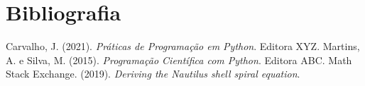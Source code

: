 \documentclass[12pt,a4paper,oneside]{extarticle}
\begin{document}
\section{Bibliografia}
\begin{thebibliography}{9}
 Carvalho, J. (2021). \emph{Práticas de Programação em Python}. Editora XYZ.
 Martins, A. e Silva, M. (2015). \emph{Programação Científica com Python}. Editora ABC.
 Math Stack Exchange. (2019). \emph{Deriving the Nautilus shell spiral equation}.
\end{thebibliography}
\end{document}
